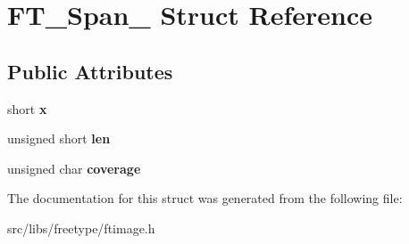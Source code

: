 \hypertarget{struct_f_t___span__}{
\section{FT\_\-Span\_\- Struct Reference}
\label{struct_f_t___span__}
}
\subsection*{Public Attributes}
\begin{DoxyCompactItemize}
\item 
\hypertarget{struct_f_t___span___a7f7235a404c66398b49c50fa09691ba5}{
short {\bfseries x}}
\label{struct_f_t___span___a7f7235a404c66398b49c50fa09691ba5}

\item 
\hypertarget{struct_f_t___span___a939c84317f25a97d0ba01704591a4d38}{
unsigned short {\bfseries len}}
\label{struct_f_t___span___a939c84317f25a97d0ba01704591a4d38}

\item 
\hypertarget{struct_f_t___span___a70f9c9e0e8d3f0b38adee03a508ae214}{
unsigned char {\bfseries coverage}}
\label{struct_f_t___span___a70f9c9e0e8d3f0b38adee03a508ae214}

\end{DoxyCompactItemize}


The documentation for this struct was generated from the following file:\begin{DoxyCompactItemize}
\item 
src/libs/freetype/ftimage.h\end{DoxyCompactItemize}
